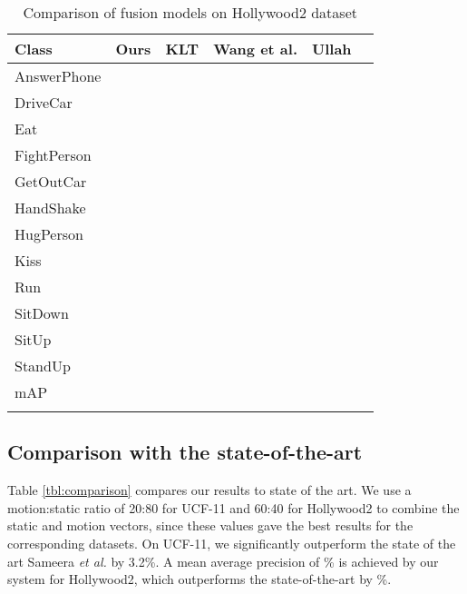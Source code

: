\begin{table}[]
\begin{tabular}{|l|l|l|l|l|l|}
\hline
Class            & Ours & KLT\cite{lucas1981iterative} & Wang et al.\cite{wang2011action} & Ullah\cite{ullah2010improving}   \\ \hline \hline
AnswerPhone       &     &     &     &         \\ 
DriveCar           &     &     &     &      \\ 
Eat           &     &     &     &          \\
FightPerson         &     &     &     &          \\ 
GetOutCar       &     &     &     &        \\ 
HandShake        &     &     &     &          \\ 
HugPerson       &     &     &     &          \\ 
Kiss        &     &     &     &          \\ 
Run        &     &     &     &          \\ 
SitDown           &     &     &     &          \\ 
SitUp           &     &     &     &          \\ 
StandUp           &     &     &     &          \\ \hline
mAP          &     &     &     &          \\ \hline
\label{tbl:per-action fusionhollywood}
\end{tabular}
\caption{Comparison of fusion models on Hollywood2 dataset}
\end{table}


\subsection{Comparison with the state-of-the-art}

Table \ref{tbl:comparison} compares our results to state of the art. We use a motion:static ratio of 20:80 for UCF-11 and 60:40
for Hollywood2 to combine the static and motion vectors,
since these values gave the best results for the corresponding datasets. On UCF-11, we significantly outperform 
the state of the art Sameera \textit{et al.}\cite{7486474} by 3.2\%. A mean average precision of \% is achieved by our system for Hollywood2, which outperforms
the state-of-the-art by \%. 

